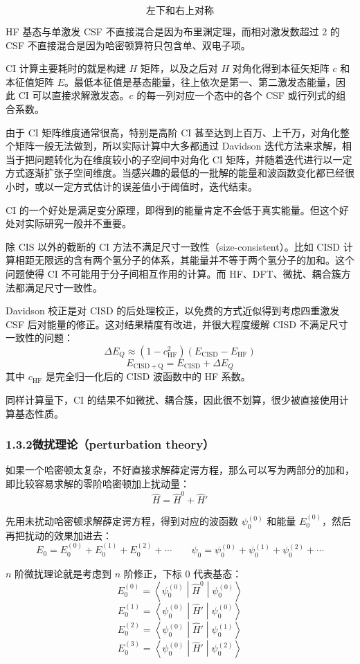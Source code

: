 \[
\text{左下和右上对称}
\]

HF 基态与单激发 CSF 不直接混合是因为布里渊定理，而相对激发数超过 2 的 CSF 不直接混合是因为哈密顿算符只包含单、双电子项。

CI 计算主要耗时的就是构建 $H$ 矩阵，以及之后对 $H$ 对角化得到本征矢矩阵 $c$ 和本征值矩阵 $E$。最低本征值是基态能量，往上依次是第一、第二激发态能量，因此 CI 可以直接求解激发态。$c$ 的每一列对应一个态中的各个 CSF 或行列式的组合系数。

由于 CI 矩阵维度通常很高，特别是高阶 CI 甚至达到上百万、上千万，对角化整个矩阵一般无法做到，所以实际计算中大多都通过 Davidson 迭代方法来求解，相当于把问题转化为在维度较小的子空间中对角化 CI 矩阵，并随着迭代进行以一定方式逐渐扩张子空间维度。当感兴趣的最低的一批解的能量和波函数变化都已经很小时，或以一定方式估计的误差值小于阈值时，迭代结束。

CI 的一个好处是满足变分原理，即得到的能量肯定不会低于真实能量。但这个好处对实际研究一般并不重要。

除 CIS 以外的截断的 CI 方法不满足尺寸一致性（size-consistent）。比如 CISD 计算相距无限远的含有两个氢分子的体系，其能量并不等于两个氢分子的加和。这个问题使得 CI 不可能用于分子间相互作用的计算。而 HF、DFT、微扰、耦合簇方法都满足尺寸一致性。

Davidson 校正是对 CISD 的后处理校正，以免费的方式近似得到考虑四重激发 CSF 后对能量的修正。这对结果精度有改进，并很大程度缓解 CISD 不满足尺寸一致性的问题：
\[
\Delta E_Q \approx (1-c_{\mathrm{HF}}^2)(E_{\mathrm{CISD}}-E_{\mathrm{HF}})
\]
\[
E_{\mathrm{CISD+Q}}=E_{\mathrm{CISD}}+\Delta E_Q
\]
其中 $c_{\mathrm{HF}}$ 是完全归一化后的 CISD 波函数中的 HF 系数。

同样计算量下，CI 的结果不如微扰、耦合簇，因此很不划算，很少被直接使用计算基态性质。

\subsubsection*{1.3.2\quad 微扰理论（perturbation theory）}

如果一个哈密顿太复杂，不好直接求解薛定谔方程，那么可以写为两部分的加和，即比较容易求解的零阶哈密顿加上扰动量：
\[
\hat H=\hat H^0+\hat H'
\]

先用未扰动哈密顿求解薛定谔方程，得到对应的波函数 $\psi_0^{(0)}$ 和能量 $E_0^{(0)}$，然后再把扰动的效果加进去：
\[
E_0=E_0^{(0)}+E_0^{(1)}+E_0^{(2)}+\cdots
\qquad
\psi_0=\psi_0^{(0)}+\psi_0^{(1)}+\psi_0^{(2)}+\cdots
\]

$n$ 阶微扰理论就是考虑到 $n$ 阶修正，下标 0 代表基态：
\[
E_0^{(0)}=\left\langle \psi_0^{(0)} \middle| \hat H^0 \middle| \psi_0^{(0)} \right\rangle
\]
\[
E_0^{(1)}=\left\langle \psi_0^{(0)} \middle| \hat H' \middle| \psi_0^{(0)} \right\rangle
\]
\[
E_0^{(2)}=\left\langle \psi_0^{(0)} \middle| \hat H' \middle| \psi_0^{(1)} \right\rangle
\]
\[
E_0^{(3)}=\left\langle \psi_0^{(0)} \middle| \hat H' \middle| \psi_0^{(2)} \right\rangle
\]

